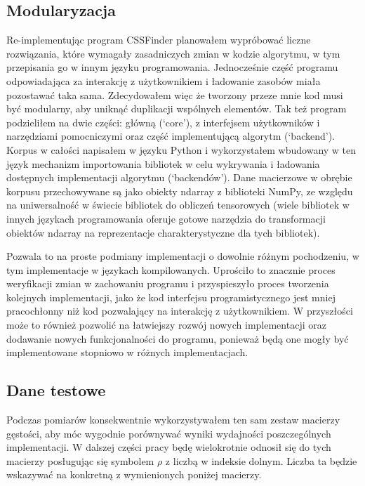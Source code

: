\documentclass[11pt, a4paper]{article}
\begin{document}
\begin{sloppypar}
    \subsection{Modularyzacja}
    Re-implementując program CSSFinder planowałem wypróbować liczne rozwiązania, które
    wymagały zasadniczych zmian w kodzie algorytmu, w tym przepisania go w innym języku programowania.
    Jednocześnie część programu odpowiadająca za interakcję z użytkownikiem i ładowanie
    zasobów miała pozostawać taka sama. Zdecydowałem więc że tworzony przeze mnie kod musi
    być modularny, aby uniknąć duplikacji wspólnych elementów. Tak też program podzieliłem
    na dwie części: główną (`core'), z interfejsem użytkowników i narzędziami pomocniczymi
    oraz część implementującą algorytm (`backend'). Korpus w całości napisałem w języku
    Python i wykorzystałem wbudowany w ten język mechanizm importowania bibliotek w celu
    wykrywania i ładowania dostępnych implementacji algorytmu (`backendów'). Dane macierzowe
    w obrębie korpusu przechowywane są jako obiekty ndarray z biblioteki NumPy, ze
    względu na uniwersalność w świecie bibliotek do obliczeń tensorowych (wiele bibliotek
    w innych językach programowania oferuje gotowe narzędzia do transformacji obiektów ndarray
    na reprezentacje charakterystyczne dla tych bibliotek).

    Pozwala to na proste podmiany implementacji o dowolnie różnym pochodzeniu, w tym implementacje
    w językach kompilowanych. Uprościło to znacznie proces weryfikacji zmian w
    zachowaniu programu i przyspieszyło proces tworzenia kolejnych implementacji, jako że
    kod interfejsu programistycznego jest mniej pracochłonny niż kod pozwalający na interakcję
    z użytkownikiem. W przyszłości może to również pozwolić na łatwiejszy rozwój nowych
    implementacji oraz dodawanie nowych funkcjonalności do programu, ponieważ będą one mogły
    być implementowane stopniowo w różnych implementacjach.

    \subsection{Dane testowe}
    Podczas pomiarów konsekwentnie wykorzystywałem ten sam zestaw macierzy gęstości, aby
    móc wygodnie porównywać wyniki wydajności poszczególnych implementacji. W dalszej części
    pracy będę wielokrotnie odnosił się do tych macierzy posługując się symbolem $\rho$ z
    liczbą w indeksie dolnym. Liczba ta będzie wskazywać na konkretną z wymienionych
    poniżej macierzy.


\end{sloppypar}
\end{document}
